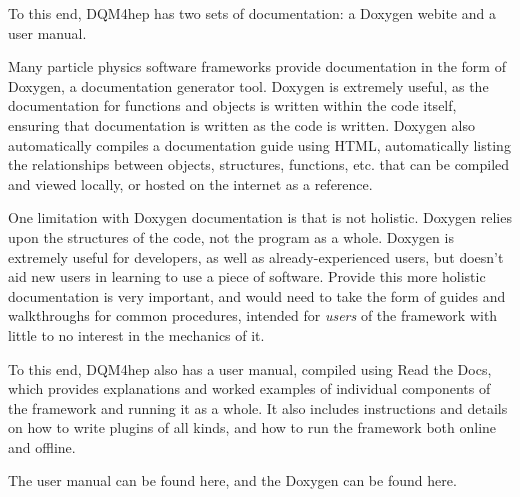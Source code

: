 To this end, DQM4hep has two sets of documentation: a Doxygen webite and a user manual.

Many particle physics software frameworks provide documentation in the form of Doxygen, a documentation generator tool. Doxygen is extremely useful, as the documentation for functions and objects is written within the code itself, ensuring that documentation is written as the code is written. Doxygen also automatically compiles a documentation guide using HTML, automatically listing the relationships between objects, structures, functions, etc. that can be compiled and viewed locally, or hosted on the internet as a reference.

One limitation with Doxygen documentation is that is not holistic. Doxygen relies upon the structures of the code, not the program as a whole. Doxygen is extremely useful for developers, as well as already-experienced users, but doesn't aid new users in learning to use a piece of software. Provide this more holistic documentation is very important, and would need to take the form of guides and walkthroughs for common procedures, intended for \emph{users} of the framework with little to no interest in the mechanics of it.

To this end, DQM4hep also has a user manual, compiled using Read the Docs, which provides explanations and worked examples of individual components of the framework and running it as a whole. It also includes instructions and details on how to write plugins of all kinds, and how to run the framework both online and offline. 

The user manual can be found here\cite{dqm4hep-user-manual}, and the Doxygen can be found here\cite{dqm4hep-doxygen}.